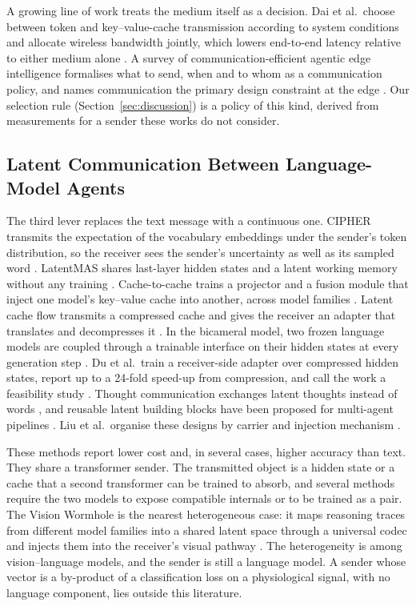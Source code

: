 A growing line of work treats the medium itself as a decision. Dai et al.\ choose between token and key--value-cache transmission according to system conditions and allocate wireless bandwidth jointly, which lowers end-to-end latency relative to either medium alone \cite{dai2026tokenkv}. A survey of communication-efficient agentic edge intelligence formalises what to send, when and to whom as a communication policy, and names communication the primary design constraint at the edge \cite{aei2026survey}. Our selection rule (Section~\ref{sec:discussion}) is a policy of this kind, derived from measurements for a sender these works do not consider.

\subsection{Latent Communication Between Language-Model Agents}
The third lever replaces the text message with a continuous one. CIPHER transmits the expectation of the vocabulary embeddings under the sender's token distribution, so the receiver sees the sender's uncertainty as well as its sampled word \cite{pham2024ciphers}. LatentMAS shares last-layer hidden states and a latent working memory without any training \cite{zou2025latent}. Cache-to-cache trains a projector and a fusion module that inject one model's key--value cache into another, across model families \cite{fu2025cachetocache}. Latent cache flow transmits a compressed cache and gives the receiver an adapter that translates and decompresses it \cite{rossi2026latentcacheflow}. In the bicameral model, two frozen language models are coupled through a trainable interface on their hidden states at every generation step \cite{flamant2026bicameral}. Du et al.\ train a receiver-side adapter over compressed hidden states, report up to a 24-fold speed-up from compression, and call the work a feasibility study \cite{du2026enabling}. Thought communication exchanges latent thoughts instead of words \cite{zheng2025thought}, and reusable latent building blocks have been proposed for multi-agent pipelines \cite{jin2026agentprimitives}. Liu et al.\ organise these designs by carrier and injection mechanism \cite{liu2026beyondtokens}.

These methods report lower cost and, in several cases, higher accuracy than text. They share a transformer sender. The transmitted object is a hidden state or a cache that a second transformer can be trained to absorb, and several methods require the two models to expose compatible internals or to be trained as a pair. The Vision Wormhole is the nearest heterogeneous case: it maps reasoning traces from different model families into a shared latent space through a universal codec and injects them into the receiver's visual pathway \cite{liu2026visionwormhole}. The heterogeneity is among vision--language models, and the sender is still a language model. A sender whose vector is a by-product of a classification loss on a physiological signal, with no language component, lies outside this literature.

